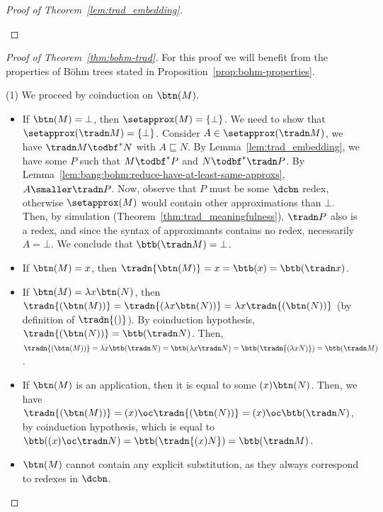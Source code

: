 \begin{proof}[Proof of Theorem~\ref{lem:trad_embedding}]
\begin{itemize}
\begin{itemize}
			\end{itemize}
	\end{itemize}
\end{proof}

\begin{proof}[Proof of Theorem~\ref{thm:bohm-trad}]
	For this proof we will benefit from the properties of Böhm trees stated
	in Proposition~\ref{prop:bohm-properties}.

	(1) We proceed by coinduction on $\btn(M)$. 
	\begin{itemize}
		\item If $\btn(M)=\bot$, then $\setapprox (M)=\{\bot\}$. We need
			to show that $\setapprox(\tradn M)=\{\bot\}$. Consider
			$A\in\setapprox(\tradn M)$, we have $\tradn M\todbf^*N$
			with $A\sqsubseteq N$. By
			Lemma~\ref{lem:trad_embedding}, we have some $P$ such
			that $M\todbf^*P$ and $N\todbf^*\tradn P$. By
			Lemma~\ref{lem:bang:bohm:reduce-have-at-least-same-approxs},
			$A\smaller \tradn P$. Now, observe that $P$ must be some
			$\dcbn$ redex, otherwise $\setapprox(M)$ would contain
			other approximations than $\bot$. Then, by simulation
			(Theorem~\ref{thm:trad_meaningfulness}), $\tradn P$ also
			is a redex, and since the syntax of approximants
			contains no redex, necessarily $A=\bot$. We conclude
			that $\btb(\tradn M)=\bot$.
		\item If $\btn(M)=x$, then
			$\tradn{\btn(M)}=x=\btb(x)=\btb(\tradn x)$.
		\item If $\btn(M)=\lambda x\btn(N)$, then
			$\tradn{(\btn(M))}=\tradn{(\lambda x\btn(N))}=\lambda
			x\tradn{(\btn(N))}$ (by definition of $\tradn{()}$). By
			coinduction hypothesis, $\tradn{(\btn(N))}=\btb(\tradn
			N)$. Then, $\tradn{(\btn(M))}=\lambda x\btb(\tradn
			N)=\btb(\lambda x\tradn N)=\btb(\tradn{(\lambda x
			N)})=\btb(\tradn M)$.
		\item If $\btn(M)$ is an application, then it is equal to
			some $(x)\btn(N)$. Then, we have
			$\tradn{(\btn(M))}=(x)\oc\tradn{(\btn(N))}=
			(x)\oc\btb(\tradn N)$, by coinduction hypothesis,
			which is equal to $\btb((x)\oc \tradn
			N)=\btb(\tradn{(x)N})=\btb(\tradn M)$.
		\item $\btn(M)$ cannot contain any explicit substitution, as they
			always correspond to redexes in $\dcbn$.
	\end{itemize}
	

\end{proof}
